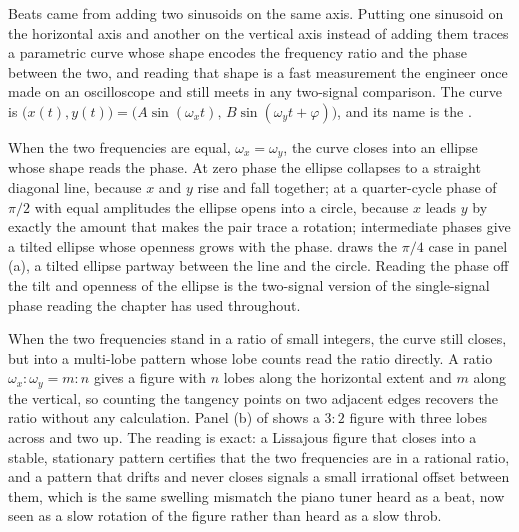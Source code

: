 Beats came from adding two sinusoids on the same axis. Putting one
sinusoid on the horizontal axis and another on the vertical axis instead
of adding them traces a parametric curve whose shape encodes the
frequency ratio and the phase between the two, and reading that shape is
a fast measurement the engineer once made on an oscilloscope and still
meets in any two-signal comparison. The curve is
$\bigl(x(t), y(t)\bigr) = \bigl(A\sin(\omega_{x} t),\,
B\sin(\omega_{y} t + \varphi)\bigr)$, and its name is the
.

When the two frequencies are equal, $\omega_{x} = \omega_{y}$, the curve
closes into an ellipse whose shape reads the phase. At zero phase the
ellipse collapses to a straight diagonal line, because $x$ and $y$ rise
and fall together; at a quarter-cycle phase of $\pi/2$ with equal
amplitudes the ellipse opens into a circle, because $x$ leads $y$ by
exactly the amount that makes the pair trace a rotation; intermediate
phases give a tilted ellipse whose openness grows with the phase.
 draws the $\pi/4$ case in panel (a), a
tilted ellipse partway between the line and the circle. Reading the
phase off the tilt and openness of the ellipse is the two-signal
version of the single-signal phase reading the chapter has used
throughout.

When the two frequencies stand in a ratio of small integers, the curve
still closes, but into a multi-lobe pattern whose lobe counts read the
ratio directly. A ratio $\omega_{x} : \omega_{y} = m : n$ gives a figure
with $n$ lobes along the horizontal extent and $m$ along the vertical,
so counting the tangency points on two adjacent edges recovers the ratio
without any calculation. Panel (b) of 
shows a $3 : 2$ figure with three lobes across and two up. The reading
is exact: a Lissajous figure that closes into a stable, stationary
pattern certifies that the two frequencies are in a rational ratio, and
a pattern that drifts and never closes signals a small irrational offset
between them, which is the same swelling mismatch the piano tuner heard
as a beat, now seen as a slow rotation of the figure rather than heard
as a slow throb.

